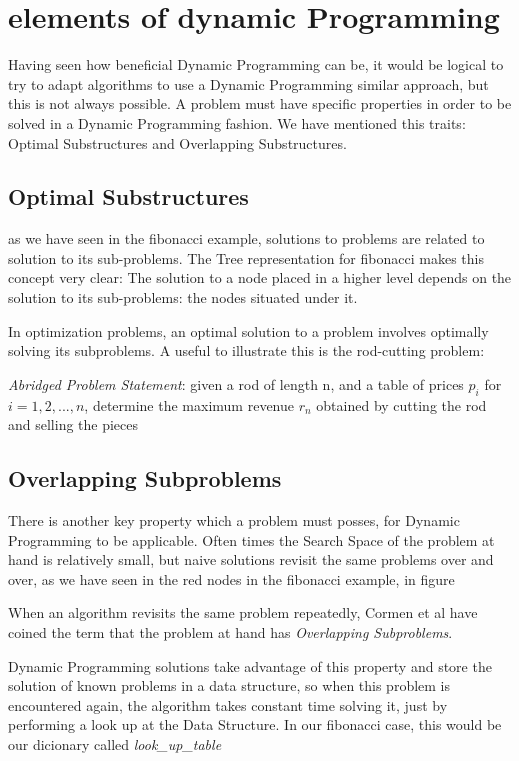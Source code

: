 \section{elements of dynamic Programming}

Having seen how beneficial Dynamic Programming can be, it would be logical to
try to adapt algorithms to use a Dynamic Programming similar approach, but this is not always possible.
A problem must have specific properties in order to be solved in a Dynamic Programming fashion. We have
mentioned this traits: Optimal Substructures and Overlapping Substructures.

\subsection{Optimal Substructures}

as we have seen in the fibonacci example, solutions to problems are 
related to solution to its sub-problems. The Tree representation for fibonacci 
makes this concept very clear: The solution to a node placed in a higher 
level depends on the solution to its sub-problems: the nodes situated under it.

In optimization problems, an optimal solution to a problem involves optimally
solving its subproblems. A useful to illustrate this is the rod-cutting problem:

\indent \emph{Abridged Problem Statement}: given a rod of length n, and a table of prices $p_i$ for $i = 1, 2, ..., n$,
determine the maximum revenue $r_n$ obtained by cutting the rod and selling the pieces \cite{cormen2009introduction}






\subsection{Overlapping Subproblems}

There is another key property which a problem must posses, for Dynamic Programming to
be applicable. Often times the Search Space of the problem at hand is relatively small,
but naive solutions revisit the same problems over and over, as we have seen in the red
nodes in the fibonacci example, in figure %

When an algorithm revisits the same problem repeatedly, Cormen et al have coined the term
that the problem at hand has \emph{Overlapping Subproblems}.

Dynamic Programming solutions take advantage of this property and store the solution
of known problems in a data structure, so when this problem is encountered again, 
the algorithm takes constant time solving it, just by performing a look up at the Data
Structure. In our fibonacci case, this would be our dicionary called \emph{look\_up\_table}